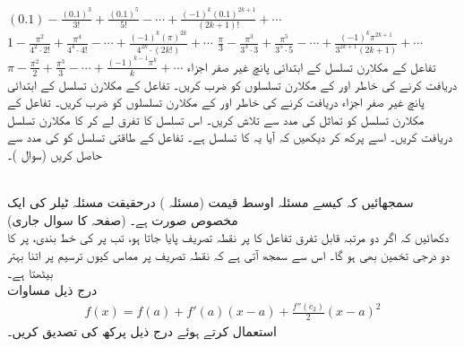 $(0.1)-\frac{(0.1)^3}{3!}+\frac{(0.1)^5}{5!}-\cdots+\frac{(-1)^k(0.1)^{2k+1}}{(2k+1)!}+\cdots$
$1-\frac{\pi^2}{4^2\cdot 2!}+\frac{\pi^4}{4^4\cdot 4!}-\cdots+\frac{(-1)^k(\pi)^{2k}}{4^{2k}\cdot (2k!)}+\cdots$
$\frac{\pi}{3}-\frac{\pi^3}{3^3\cdot 3}+\frac{\pi^5}{3^5\cdot 5}-\cdots+\frac{(-1)^k\pi^{2k+1}}{3^{2k+1}(2k+1)}+\cdots$
$\pi-\frac{\pi^2}{2}+\frac{\pi^3}{3}-\cdots+\frac{(-1)^{k-1}\pi^k}{k}+\cdots$
تفاعل  کے مکلارن تسلسل کے ابتدائی پانچ غیر صفر اجزاء دریافت کرنے کی خاطر  اور  کے مکلارن تسلسلوں کو ضرب کریں۔ 
تفاعل  کے مکلارن تسلسل کے ابتدائی پانچ غیر صفر اجزاء دریافت کرنے کی خاطر  اور  کے مکلارن تسلسلوں کو  ضرب کریں۔ 
تفاعل  کے مکلارن تسلسل کو تماثل  کی مدد سے تلاش  کریں۔ اس تسلسل کا تفرق لے کر  کا مکلارن تسلسل دریافت کریں۔ اسے  پرکھ کر دیکھیں کہ  آیا  یہ  کا تسلسل ہے۔
تفاعل کے طاقتی تسلسل  کو  کی مدد سے حاصل کریں (سوال )۔

\\
سمجھائیں  کہ کیسے مسئلہ اوسط قیمت (مسئلہ ) درحقیقت مسئلہ ٹیلر کی ایک مخصوص صورت ہے۔
 (صفحہ   کا سوال  جاری)\\
دکھائیں کہ  اگر دو مرتبہ  قابل تفرق تفاعل  کا  پر  نقطہ تصریف پایا جاتا ہو، تب  پر  کی خط بندی،  پر کا  دو درجی تخمین بھی ہو گا۔ اس سے سمجھ آتی ہے کہ نقطہ تصریف پر مماس کیوں ترسیم پر اتنا بہتر بیٹھتا ہے۔ 
\\
درج ذیل مساوات
\begin{align*}
f(x)=f(a)+f'(a)(x-a)+\frac{f''(c_2)}{2}(x-a)^2
\end{align*}
استعمال کرتے ہوئے درج ذیل پرکھ کی تصدیق کریں۔


